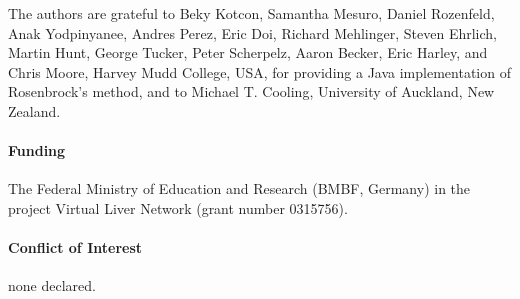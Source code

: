 \documentclass{bioinfo}
\begin{document}
The authors are grateful to Beky Kotcon, Samantha Mesuro, Daniel Rozenfeld, Anak
Yodpinyanee, Andres Perez, Eric Doi, Richard Mehlinger, Steven Ehrlich, Martin
Hunt, George Tucker, Peter Scherpelz, Aaron Becker, Eric Harley, and Chris
Moore, Harvey Mudd College, USA, for providing a Java implementation of
Rosenbrock's method, and to Michael T. Cooling, University of Auckland, New
Zealand.

\paragraph{Funding\textcolon} 
The Federal Ministry of Education and Research (BMBF, Germany) in the project
Virtual Liver Network (grant number 0315756).

\paragraph{Conflict of Interest\textcolon} none declared.


%
%
%
%
%
%
%

\end{document}
